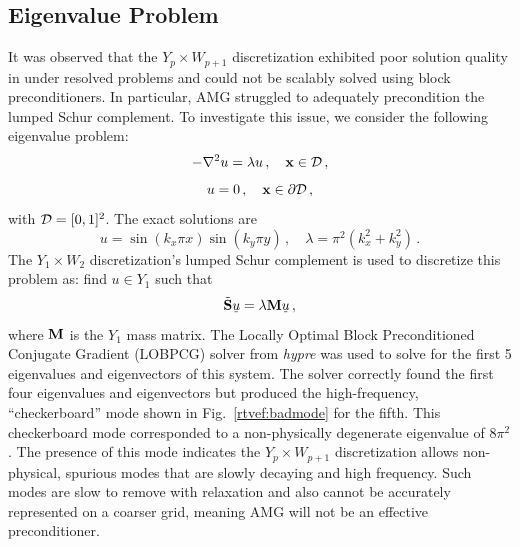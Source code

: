\documentclass[../doc.tex]{subfiles}
\begin{document}
\subsection{Eigenvalue Problem}
It was observed that the $Y_p \times W_{p+1}$ discretization exhibited poor solution quality in under resolved problems and could not be scalably solved using block preconditioners. In particular, AMG struggled to adequately precondition the lumped Schur complement. To investigate this issue, we consider the following eigenvalue problem: 
	\begin{equation}
		-\nabla^2 u = \lambda u \,, \quad \boldsymbol{\mathrm{x}} \in \mathcal{D}\,, 
	\end{equation}
	\begin{equation}
		u = 0 \,, \quad \boldsymbol{\mathrm{x}} \in \partial \mathcal{D} \,,
	\end{equation}
with $\mathcal{D} = [0,1]^2$. 
The exact solutions are 
	\begin{equation}
		u = \sin(k_x \pi x) \sin(k_y \pi y) \,, \quad \lambda = \pi^2(k_x^2 + k_y^2) \,. 
	\end{equation}
The $Y_1 \times W_2$ discretization's lumped Schur complement is used to discretize this problem as: find $u \in Y_1$ such that 
	\begin{equation}
		\tilde{\boldsymbol{\mathrm{S}}} \,\underline{\!u\!}\, = \lambda \boldsymbol{\mathrm{M}} \,\underline{\!u\!}\, \,,
	\end{equation}
where $\boldsymbol{\mathrm{M}}$ is the $Y_1$ mass matrix. The Locally Optimal Block Preconditioned Conjugate Gradient (LOBPCG) solver from \emph{hypre} was used to solve for the first 5 eigenvalues and eigenvectors of this system. The solver correctly found the first four eigenvalues and eigenvectors but produced the high-frequency, ``checkerboard'' mode shown in Fig.~\ref{rtvef:badmode} for the fifth. This checkerboard mode corresponded to a non-physically degenerate eigenvalue of $8\pi^2$. The presence of this mode indicates the $Y_p \times W_{p+1}$ discretization allows non-physical, spurious modes that are slowly decaying and high frequency. Such modes are slow to remove with relaxation and also cannot be accurately represented on a coarser grid, meaning AMG will not be an effective preconditioner. 
\end{document}
